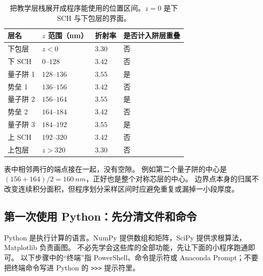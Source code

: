 \begin{table}[htbp]
\centering
\caption{把教学层栈展开成程序能使用的位置区间。$z=0$ 是下 SCH 与下包层的界面。}
\label{tab:vertical-layer-positions}
\begin{tabular}{llll}
\toprule
层名 & $z$ 范围（nm） & 折射率 & 是否计入阱层重叠\\
\midrule
下包层 & $z<0$ & $3.30$ & 否\\
下 SCH & $0$--$128$ & $3.42$ & 否\\
量子阱 1 & $128$--$136$ & $3.55$ & 是\\
势垒 1 & $136$--$156$ & $3.42$ & 否\\
量子阱 2 & $156$--$164$ & $3.55$ & 是\\
势垒 2 & $164$--$184$ & $3.42$ & 否\\
量子阱 3 & $184$--$192$ & $3.55$ & 是\\
上 SCH & $192$--$320$ & $3.42$ & 否\\
上包层 & $z>320$ & $3.30$ & 否\\
\bottomrule
\end{tabular}
\end{table}
表中相邻两行的端点接在一起，没有空隙。
例如第二个量子阱的中心是 $(156+164)/2=\SI{160}{nm}$，正好也是整个对称芯层的中心。
边界点本身的归属不改变连续积分面积，但程序划分采样区间时应避免重复或漏掉一小段厚度。

\subsection{第一次使用 Python：先分清文件和命令}
Python 是执行计算的语言。NumPy 提供数组和矩阵，SciPy 提供求根算法，Matplotlib 负责画图。
不必先学会这些库的全部功能，先让下面的小程序跑通即可。
以下步骤中的“终端”指 PowerShell、命令提示符或 Anaconda Prompt；不要把终端命令写进 Python 的 \texttt{>>>} 提示符里。

